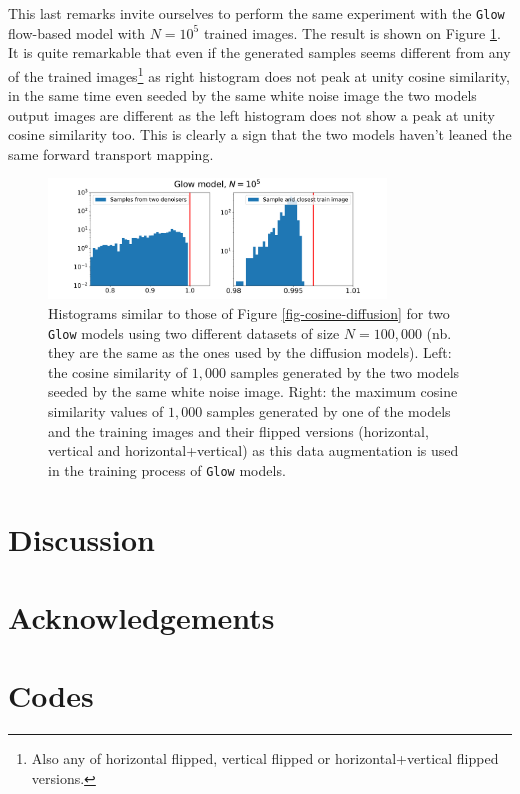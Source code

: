 \documentclass[11pt]{amsart}
\begin{document}
This last remarks invite ourselves to perform the same experiment with the \texttt{Glow} flow-based model with $N=10^5$ trained images. The result is shown on Figure \ref{fig-cosine-glow}. It is quite remarkable that even if the generated samples seems different from any of the trained images\footnote{Also any of horizontal flipped, vertical flipped or horizontal+vertical flipped versions.} as right histogram does not peak at unity cosine similarity, in the same time even seeded by the same white noise image the two models output images are different as the left histogram does not show a peak at unity cosine similarity too. This is clearly a sign that the two models haven't leaned the same forward transport mapping. 
%
\begin{figure}
    \centering
	\includegraphics[width=0.8\textwidth]{fig-glow-cosine-AB_ATrain.pdf}
	\caption{Histograms similar to those of Figure \ref{fig-cosine-diffusion} for two \texttt{Glow} models using two different datasets of size $N=100,000$ (nb. they are the same as the ones used by the diffusion models). Left: the cosine similarity of $1,000$ samples generated by the two models seeded by the same white noise image. Right: the maximum cosine similarity values of $1,000$ samples generated by one of the models and the training images and their flipped versions (horizontal, vertical and horizontal+vertical) as this data augmentation is used in the training process of \texttt{Glow} models.}
	\label{fig-cosine-glow} 
\end{figure}




\section{Discussion}


\section*{Acknowledgements}

\section*{Codes}


\end{document}

